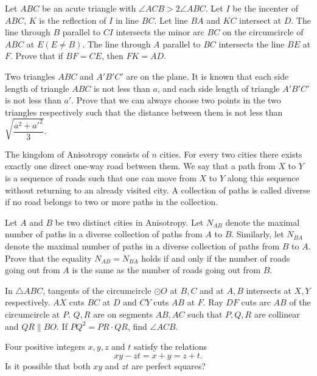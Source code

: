 \documentclass[11pt]{scrartcl}
\begin{document}
\begin{problem}[156060759856343521]
Let $ABC$ be an acute triangle with $\angle ACB>2 \angle ABC$. Let $I$ be the incenter of $ABC$, $K$ is the reflection of $I$ in line $BC$. Let line $BA$ and $KC$ intersect at $D$. The line through $B$ parallel to $CI$ intersects the minor arc $BC$ on the circumcircle of $ABC$ at $E(E \neq B)$. The line through $A$ parallel to $BC$ intersects the line $BE$ at $F$.
Prove that if $BF=CE$, then $FK=AD$.
\end{problem}
\begin{problem}[3838489129977355762]
Two triangles $ABC$ and $A'B'C'$ are on the plane. It is known that each side length of triangle $ABC$ is not less than $a$, and each side length of triangle $A'B'C'$ is not less than $a'$. Prove that we can always choose two points in the two triangles respectively such that the distance between them is not less than $\sqrt{\dfrac{a^2+a'^2}{3}}$.
\end{problem}
\begin{problem}[9103148252094553273]
	The kingdom of Anisotropy consists of $n$ cities. For every two cities there exists exactly one direct one-way road between them. We say that a path from $X$ to $Y$ is a sequence of roads such that one can move from $X$ to $Y$ along this sequence without returning to an already visited city. A collection of paths is called diverse if no road belongs to two or more paths in the collection.

Let $A$ and $B$ be two distinct cities in Anisotropy. Let $N_{AB}$ denote the maximal number of paths in a diverse collection of paths from $A$ to $B$. Similarly, let $N_{BA}$ denote the maximal number of paths in a diverse collection of paths from $B$ to $A$. Prove that the equality $N_{AB} = N_{BA}$ holds if and only if the number of roads going out from $A$ is the same as the number of roads going out from $B$.
\end{problem}
\begin{problem}[162618813015033]
In $\triangle {ABC}$, tangents of the circumcircle $\odot {O}$ at $B, C$ and at $A, B$ intersects at $X, Y$ respectively. $AX$ cuts $BC$ at ${D}$ and $CY$ cuts $AB$ at ${F}$. Ray $DF$ cuts arc $AB$ of the circumcircle at ${P}$. $Q, R$ are on segments $AB, AC$ such that $P, Q, R$ are collinear and $QR \parallel BO$. If $PQ^2=PR \cdot QR$, find $\angle ACB$.
\end{problem}
\begin{problem}[4678973565823282552]
Four positive integers $x,y,z$ and $t$ satisfy the relations
\[ xy - zt = x + y = z + t. \]Is it possible that both $xy$ and $zt$ are perfect squares?
\end{problem}
\end{document}
